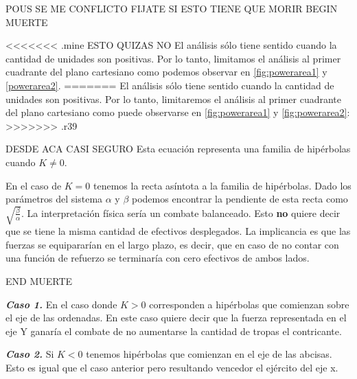 \documentclass{sig-alternate}
\begin{document}
POUS SE ME CONFLICTO FIJATE SI ESTO TIENE QUE MORIR
BEGIN MUERTE

<<<<<<< .mine
ESTO QUIZAS NO
El an\'alisis s\'olo tiene sentido cuando la cantidad de unidades son positivas.
Por lo tanto, limitamos el an\'alisis al primer cuadrante del plano cartesiano como podemos observar en \ref{fig:powerarea1} y \ref{powerarea2}.
=======
El an\'alisis s\'olo tiene sentido cuando la cantidad de unidades son positivas. Por lo tanto, limitaremos el an\'alisis al primer cuadrante del plano cartesiano como puede observarse en \ref{fig:powerarea1} y \ref{fig:powerarea2}:
>>>>>>> .r39

DESDE ACA CASI SEGURO
Esta ecuación representa una familia de hip\'erbolas cuando $K \ne 0$.

En el caso de $K = 0$ tenemos la recta asíntota a la familia de
hipérbolas. Dado los parámetros del sistema $\alpha$ y $\beta$ podemos
encontrar la pendiente de esta recta como
$\sqrt{\frac{\beta}{\alpha}}$. La interpretación f\'isica ser\'ia un
combate balanceado. Esto \textbf{no} quiere decir que se tiene la misma
cantidad de efectivos desplegados. La implicancia es que las fuerzas se equiparar\'ian en el largo plazo, es decir, que en caso de no contar con una
funci\'on de refuerzo se terminar\'ia con cero efectivos de ambos lados.

END MUERTE

\textbf{\textit{Caso 1.}} En el caso donde $K > 0$ corresponden a hip\'erbolas que comienzan
sobre el eje de las ordenadas. En este caso quiere decir que la fuerza representada
en el eje Y ganar\'ia el combate de no aumentarse la cantidad de tropas
el contricante.


\textbf{\textit{Caso 2.}} Si $K<0$ tenemos hip\'erbolas que comienzan
en el eje de las abcisas. Esto es igual que el caso anterior pero resultando vencedor el ejército del eje x.
\end{document}
